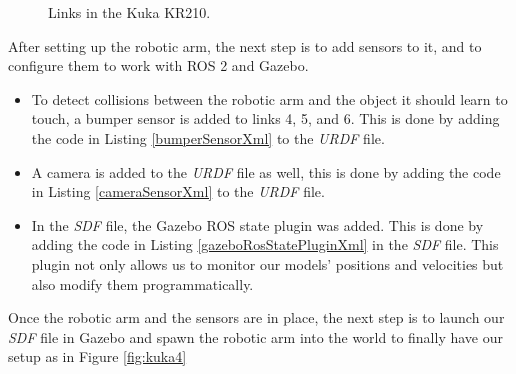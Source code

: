 \documentclass[12pt,oneside]{article}
\begin{document}
\begin{figure}[H]
  \centering
  \hfill
  \caption{Links in the Kuka KR210.}
\end{figure}

After setting up the robotic arm, the next step is to add sensors to it, and to configure them to work with ROS 2 and Gazebo.
\begin{itemize}
\item To detect collisions between the robotic arm and the object it should learn to touch, a bumper sensor is added to links 4, 5, and 6. This is done by adding the code in Listing \ref{bumperSensorXml} to the \textit{URDF} file.

\item A camera is added to the \textit{URDF} file as well, this is done by adding the code in Listing \ref{cameraSensorXml} to the \textit{URDF} file.

\item In the \textit{SDF} file, the Gazebo ROS state plugin was added. This is done by adding the code in Listing \ref{gazeboRosStatePluginXml} in the \textit{SDF} file. This plugin not only allows us to monitor our models' positions and velocities but also modify them programmatically.
\end{itemize}

Once the robotic arm and the sensors are in place, the next step is to launch our \textit{SDF} file in Gazebo and spawn the robotic arm into the world to finally have our setup as in Figure \ref{fig:kuka4}
\end{document}
